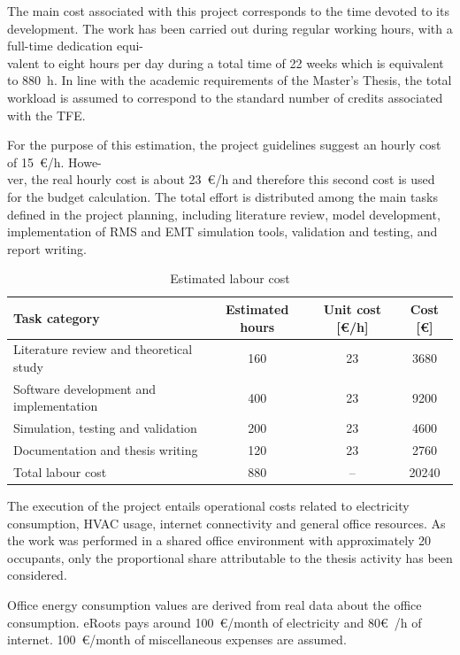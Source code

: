 The main cost associated with this project corresponds to the time devoted to its development. 
The work has been carried out during regular working hours, with a full-time dedication equi-\\valent 
to eight hours per day during a total time of 22 weeks which is equivalent to 880~h. In line with the academic requirements of the Master's Thesis, the total workload 
is assumed to correspond to the standard number of credits associated with the TFE.

For the purpose of this estimation, the project guidelines suggest an hourly cost of 15~€/h. Howe-\\ver, the real hourly cost
is about 23~€/h and therefore this second cost is used for the budget calculation.
The total effort is distributed among the main tasks defined in the project planning, including literature review, 
model development, implementation of RMS and EMT simulation tools, validation and testing, and report writing.

\begin{table}[H]
\centering
\caption{Estimated labour cost}
\begin{tabular}{l c c c}
\hline
Task category & Estimated hours & Unit cost [€/h] & Cost [€] \\
\hline
Literature review and theoretical study & 160 & 23 & 3680 \\
Software development and implementation & 400 & 23 & 9200 \\
Simulation, testing and validation & 200 & 23 & 4600 \\
Documentation and thesis writing & 120 & 23 & 2760 \\
\hline
Total labour cost & 880 & -- & 20240 \\
\hline
\end{tabular}
\end{table}

The execution of the project entails operational costs related to electricity consumption, HVAC usage, 
internet connectivity and general office resources. As the work was performed in a shared office 
environment with approximately 20 occupants, only the proportional share attributable to the thesis 
activity has been considered.

Office energy consumption values are derived from real data about the office consumption. eRoots pays around 100~€/month of electricity and
80€~/h of internet. 100~€/month of miscellaneous expenses are assumed.

